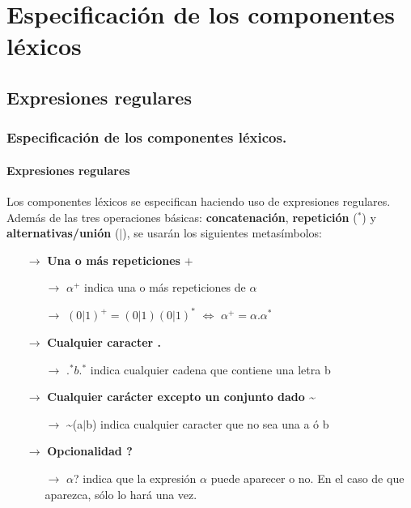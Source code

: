 \documentclass{beamer}
\begin{document}
	\section{Especificaci\'on de los componentes l\'exicos}
	
	    \subsection{Expresiones regulares}

		\begin{frame}
			\frametitle{Especificaci\'on de los componentes l\'exicos.}
			\framesubtitle{Expresiones regulares}

			\begin{exampleblock}{}
			    Los componentes l\'exicos se especifican haciendo uso de expresiones regulares. Adem\'as de las tres operaciones b\'asicas: \textbf{concatenaci\'on}, \textbf{repetici\'on} ($^*$) y \textbf{alternativas/uni\'on} ($|$), se usar\'an los siguientes metas\'imbolos:
			    \begin{itemize}
			        \item[$\rightarrow$] \textbf{Una o m\'as repeticiones} $+$
			        \begin{itemize}
			            \item[$\rightarrow$] $\alpha^{+}$ indica una o m\'as repeticiones de $\alpha$
			            \item[$\rightarrow$] $(0|1)^{+} = (0|1)(0|1)^{*}$ $\Leftrightarrow$ $\alpha^{+} = \alpha.\alpha^{*}$
			        \end{itemize}
                    \item[$\rightarrow$] \textbf{Cualquier caracter .}
                    \begin{itemize}
			            \item[$\rightarrow$] $.^{*}b.^{*}$ indica cualquier cadena que contiene una letra b
                    \end{itemize}
                    \item[$\rightarrow$] \textbf{Cualquier car\'acter excepto un conjunto dado \textasciitilde}
                    \begin{itemize}
                        \item[$\rightarrow$] \textasciitilde(a$|$b) indica cualquier caracter que no sea una a \'o b
                    \end{itemize}
                    \item[$\rightarrow$] \textbf{Opcionalidad ?}
                    \begin{itemize}
                        \item[$\rightarrow$] $\alpha$? indica que la expresi\'on $\alpha$ puede aparecer o no. En el caso de que aparezca, s\'olo lo har\'a una vez.
                    \end{itemize}
			    \end{itemize}
			\end{exampleblock}
		\end{frame}		
\end{document}
